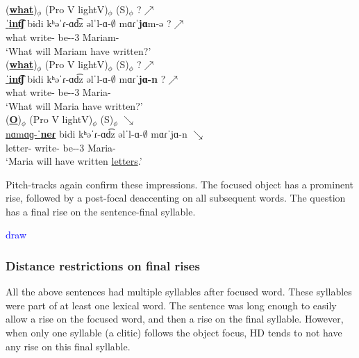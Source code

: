\begin{exe}
	\ex \label{example:intontion:focus:wh:obj:periph:ovs} \begin{xlist}
		\ex \glll (\underline{\textbf{what}})$_\phi$ (Pro V lightV)$_\phi$   ({S})$_\phi$  ?$\nearrow$ \\
		\underline{ˈ\textbf{int͡ʃ}} bidi kʰəˈɾ-ɑd͡z əlˈl-ɑ-$\emptyset$ mɑɾˈ\textbf{jɑ}m-ə  ?$\nearrow$ \\
		what {\fut} write-{\rptcp} be-{\thgloss}-3{\sg} Mariam-{}  \\ 
		\trans `What will Mariam have written?'
		\\ 
		\ex \glll (\underline{\textbf{what}})$_\phi$ (Pro V lightV)$_\phi$   ({S})$_\phi$  ?$\nearrow$ \\
		\underline{ˈ\textbf{int͡ʃ}} bidi kʰəˈɾ-ɑd͡z əlˈl-ɑ-$\emptyset$ mɑɾˈ\textbf{jɑ-n}  ?$\nearrow$ \\
		what {\fut} write-{\rptcp} be-{\thgloss}-3{\sg} Maria-{}  \\ 
		\trans `What will Maria have written?'
		\\ 
		\ex \glll(\underline{\textbf{O}})$_\phi$ (Pro V lightV)$_\phi$   ({S})$_\phi$  $\searrow$ \\
		\underline{nɑmɑɡ-ˈ\textbf{neɾ}} bidi kʰəˈɾ-ɑd͡z əlˈl-ɑ-$\emptyset$ mɑɾˈ{jɑ-n}  $\searrow$ \\
		letter-{\pl} {\fut} write-{\rptcp} be-{\thgloss}-3{\sg} Maria-{}  \\ 
		\trans `Maria will have written \underline{letters}.'
		\\ 
		
	\end{xlist}
\end{exe}

Pitch-tracks again confirm these impressions. The focused object has a prominent rise, followed by a post-focal deaccenting on all subsequent words. The question has a final rise on the sentence-final syllable. 



\textcolor{blue}{draw}

\subsubsection{Distance restrictions on final rises}\label{section:intonation:focus:wh:length}
All the above sentences had multiple syllables after focused word. These syllables were part of at least one lexical word. The sentence was long enough to easily allow a rise on the focused word, and then a rise on the final syllable.  However, when only one syllable (a clitic) follows the object focus, HD tends to not have any rise on this final syllable. 

